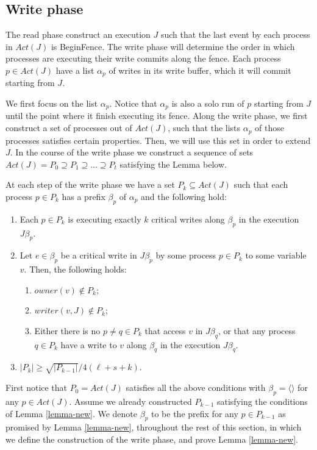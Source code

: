 \newpage
\subsection{Write phase}
The read phase construct an execution $J$ such that the last event by each process in $Act(J)$ is BeginFence. The write phase will determine the order in which processes are executing their write commits along the fence. Each process $p \in Act(J)$ have a list $\alpha_p$ of writes in its write buffer, which it will commit starting from $J$.

We first focus on the list $\alpha_p$. Notice that $\alpha_p$ is also a solo run of $p$ starting from $J$ until the point where it finish executing its fence. Along the write phase, we first construct a set of processes out of $Act(J)$, such that the lists $\alpha_p$ of those processes satisfies certain properties. Then, we will use this set in order to extend $J$.
In the course of the write phase we construct a sequence of sets $Act(J) = P_0 \supseteq P_1 \supseteq \ldots \supseteq P_t$ satisfying the Lemma below.

\begin{lemma} \label{lemma-new}
	At each step of the write phase we have a set $P_k \subseteq Act(J)$ such that each process $p \in P_k$ has a prefix $\beta_p$ of $\alpha_p$ and the following hold:
	\begin{enumerate}[(1)]
		\item Each $p \in P_k$ is executing exactly $k$ critical writes along $\beta_p$ in the execution $J \beta_p$.
		\item Let $e \in \beta_p$ be a critical write in $J \beta_p$ by some process $p \in P_k$ to some variable $v$. Then, the following holds:
		\begin{enumerate}
			\item $owner(v) \notin P_k$;
			\item $writer(v,J) \notin P_k$;
			\item Either there is no $p \neq q \in P_k$ that access $v$ in $J \beta_q$, or that any process $q \in P_k$ have a write to $v$ along $\beta_q$ in the execution $J \beta_q$.
		\end{enumerate}
		\item $|P_k| \geq \sqrt{|P_{k-1}|}/4(\ell+s+k)$.
	\end{enumerate}
\end{lemma}

First notice that $P_0=Act(J)$ satisfies all the above conditions with $\beta_p=\langle \rangle$ for any $p \in Act(J)$. Assume we already constructed $P_{k-1}$ satisfying the conditions of Lemma \ref{lemma-new}. We denote $\beta_p$ to be the prefix for any $p \in P_{k-1}$ as promised by Lemma \ref{lemma-new}, throughout the rest of this section, in which we define the construction of the write phase, and prove Lemma \ref{lemma-new}.

